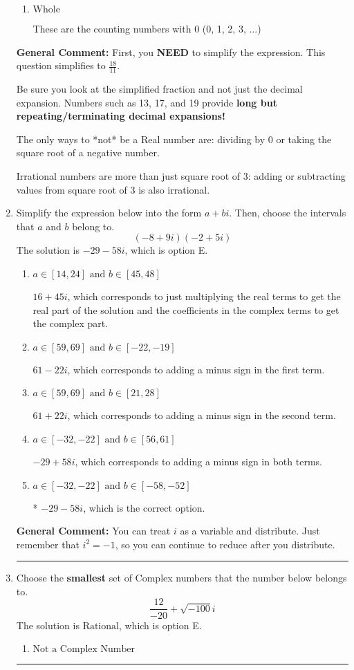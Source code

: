 \documentclass{extbook}[14pt]
\newcommand{\litem}[1]{\item #1

\rule{\textwidth}{0.4pt}}
\begin{document}
\begin{enumerate}
{\begin{enumerate}[label=\Alph*.]
These are Nonreal Complex numbers \textbf{OR} things that are not numbers (e.g., dividing by 0).
\item \( \text{Whole} \)

These are the counting numbers with 0 (0, 1, 2, 3, ...)
\end{enumerate}

\textbf{General Comment:} First, you \textbf{NEED} to simplify the expression. This question simplifies to $\frac{18}{11}$. 
 
 Be sure you look at the simplified fraction and not just the decimal expansion. Numbers such as 13, 17, and 19 provide \textbf{long but repeating/terminating decimal expansions!} 
 
 The only ways to *not* be a Real number are: dividing by 0 or taking the square root of a negative number. 
 
 Irrational numbers are more than just square root of 3: adding or subtracting values from square root of 3 is also irrational.
}
\litem{
Simplify the expression below into the form $a+bi$. Then, choose the intervals that $a$ and $b$ belong to.
\[ (-8 + 9 i)(-2 + 5 i) \]The solution is \( -29 - 58 i \), which is option E.\begin{enumerate}[label=\Alph*.]
\item \( a \in [14, 24] \text{ and } b \in [45, 48] \)

 $16 + 45 i$, which corresponds to just multiplying the real terms to get the real part of the solution and the coefficients in the complex terms to get the complex part.
\item \( a \in [59, 69] \text{ and } b \in [-22, -19] \)

 $61 - 22 i$, which corresponds to adding a minus sign in the first term.
\item \( a \in [59, 69] \text{ and } b \in [21, 28] \)

 $61 + 22 i$, which corresponds to adding a minus sign in the second term.
\item \( a \in [-32, -22] \text{ and } b \in [56, 61] \)

 $-29 + 58 i$, which corresponds to adding a minus sign in both terms.
\item \( a \in [-32, -22] \text{ and } b \in [-58, -52] \)

* $-29 - 58 i$, which is the correct option.
\end{enumerate}

\textbf{General Comment:} You can treat $i$ as a variable and distribute. Just remember that $i^2=-1$, so you can continue to reduce after you distribute.
}
\litem{
Choose the \textbf{smallest} set of Complex numbers that the number below belongs to.
\[ \frac{12}{-20}+\sqrt{-100}i \]The solution is \( \text{Rational} \), which is option E.\begin{enumerate}[label=\Alph*.]
\item \( \text{Not a Complex Number} \)


\end{enumerate}}
\end{enumerate}
\end{document}
